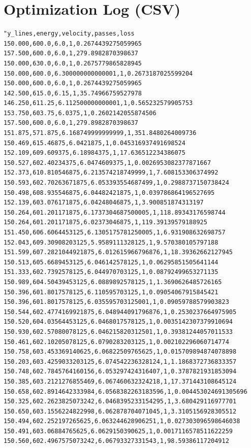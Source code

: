 \documentclass[11pt]{article}
\begin{document}
\section{Optimization Log (CSV)}
\footnotesize
\begin{verbatim}
"y_lines,energy,velocity,passes,loss
150.000,600.0,6.0,1,0.2674439275059965
157.500,600.0,6.0,1,279.8982870398637
150.000,630.0,6.0,1,0.2675779865828945
150.000,600.0,6.300000000000001,1,0.2673187025599204
150.000,600.0,6.0,1,0.2674439275059965
142.500,615.0,6.15,1,35.74966759527978
146.250,611.25,6.112500000000001,1,0.565232579905753
153.750,603.75,6.0375,1,0.2602142055874506
157.500,600.0,6.0,1,279.8982870398637
151.875,571.875,6.168749999999999,1,351.8480264009736
150.469,615.46875,6.0421875,1,0.045316937491698524
152.109,609.609375,6.18984375,1,17.636512234386075
150.527,602.40234375,6.0474609375,1,0.0026953082377871667
152.373,610.810546875,6.213574218749999,1,7.608153306374992
150.593,602.70263671875,6.053393554687499,1,0.2988737150738424
150.498,608.935546875,6.04482421875,1,0.039786864196527695
152.139,603.076171875,6.04248046875,1,3.900851874313197
150.264,601.201171875,6.1737304687500005,1,118.89343176598744
150.264,601.201171875,6.02373046875,1,119.39139579188925
151.450,606.6064453125,6.1305175781250005,1,6.931908632698757
152.043,609.30908203125,5.9589111328125,1,9.570380105797188
151.599,607.2821044921875,6.012615966796876,1,18.39362662127945
150.513,605.6689453125,6.046142578125,1,0.06295851505641144
151.333,602.7392578125,6.044970703125,1,0.08792499653271135
150.989,604.50439453125,6.0889892578125,1,1.3690626485726165
150.396,601.8017578125,6.110595703125,1,0.09054067915845421
150.396,601.8017578125,6.035595703125001,1,0.09059788579903823
150.544,602.4774169921875,6.048944091796876,1,0.2530237664975905
150.520,604.03564453125,6.0468017578125,1,0.0035142307379910694
150.930,602.57080078125,6.046215820312501,1,0.39381244057011533
150.461,602.10205078125,6.0790283203125,1,0.002102296060714774
150.758,603.453369140625,6.06822509765625,1,0.015709894874078898
150.203,603.4259033203125,6.074542236328124,1,1.1868372736833357
150.748,602.7845764160156,6.053297424316407,1,0.3787821931853094
150.385,603.2121276855469,6.067460632324218,1,17.371443108645124
150.658,602.8914642333984,6.0568382263183596,1,0.004453024691305696
150.325,602.2623825073242,6.0468395233154295,1,3.680429116977701
150.650,603.1556224822998,6.062878704071045,1,3.3105156928305512
150.494,602.252197265625,6.063244628906251,1,0.027303096598646038
150.491,603.06884765625,6.0629150390625,1,0.0017116578511622259
150.560,602.4967575073242,6.06793327331543,1,98.59386117204912

\end{verbatim}
\end{document}
